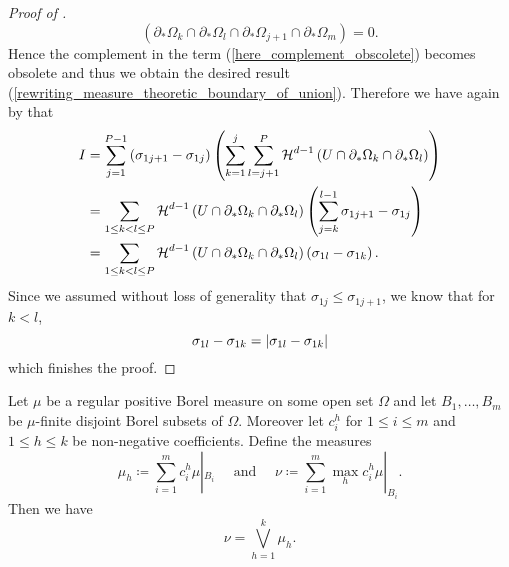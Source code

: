 \begin{proof}[Proof of ]
\begin{equation*}
		\left(
		\partial_{ \ast } \Omega_{ k }
		\cap
		\partial_{ \ast } \Omega_{ l } 
		\cap
		\partial_{ \ast } \Omega_{ j + 1 }
		\cap
		\partial_{ \ast } \Omega_{ m }
		\right) = 0.
	\end{equation*}
	Hence the complement in the term (\ref{here_complement_obscolete}) becomes 
	obsolete and thus we obtain the desired result 
	(\ref{rewriting_measure_theoretic_boundary_of_union}).
	Therefore we have again by   that
	\begin{align*}
		I &=
		\sum_{ j = 1 }^{ P - 1 }
		\left(
		\sigma_{ 1 j + 1 } - \sigma_{ 1 j }
		\right)
		\left(
		\sum_{ k = 1 }^{ j }
		\sum_{ l = j + 1 }^{ P }
		\operatorname{\mathcal{H}}^{ d - 1 } \left( 
		U 
		\cap 
		\partial_{ \ast } \Omega_{ k } 
		\cap 
		\partial_{ \ast } \Omega_{ l }
		\right)
		\right)
		\\
		& =
		\sum_{ 1 \leq k < l \leq P }
		\operatorname{\mathcal{H}}^{ d - 1 } \left(
		U \cap \partial_{ \ast } \Omega_{ k }
		\cap
		\partial_{ \ast } \Omega_{ l }
		\right)
		\left(
		\sum_{ j = k }^{ l - 1 }
		\sigma_{ 1 j + 1 } - \sigma_{ 1 j }
		\right)
		\\
		& =
		\sum_{ 1 \leq k < l \leq P }
		\operatorname{\mathcal{H}}^{ d - 1 } \left(
		U \cap 
		\partial_{ \ast } \Omega_{ k }
		\cap
		\partial_{ \ast } \Omega_{ l }
		\right)
		\left(
		\sigma_{ 1 l } - \sigma_{ 1 k }
		\right).
	\end{align*}
	Since we assumed without loss of generality that $ \sigma_{ 1 j } \leq 
	\sigma_{ 1 j + 1 } $, we know that
	for $ k < l $,
	\begin{equation*}
		\sigma_{ 1  l } - \sigma_{ 1 k }
		=
		\abs{ \sigma_{ 1 l } - \sigma_{ 1 k } }
	\end{equation*}
	which finishes the proof.
\end{proof}

\begin{lemma}
	\label{supremum_of_measures_lemma}
	Let $ \mu $ be a regular positive Borel measure on some open set $ \Omega $ and let $ B_{ 1 }, \dotsc, B_{ m } $ be $ \mu $-finite disjoint Borel subsets of $ \Omega $. Moreover let $ c_{ i }^{ h } $ for $ 1 \leq i \leq m $ and $ 1 \leq h \leq k $ be non-negative coefficients. Define the measures
	\begin{equation*}
		\mu_{ h } 
		\coloneqq
		\sum_{ i = 1 }^{ m }
		c_{ i }^{ h }
		\mu |_{ B_{ i } }
		\quad
		\text{ and }
		\quad 
		\nu 
		\coloneqq
		\sum_{ i = 1 }^{ m }
		\max_{ h } c_{ i }^{ h }
		\mu |_{ B_{ i } }.
	\end{equation*}
	Then we have
	\begin{equation*}
		\nu 
		=
		\bigvee_{ h = 1 }^{ k }
		\mu_{ h }.
	\end{equation*}
\end{lemma}

